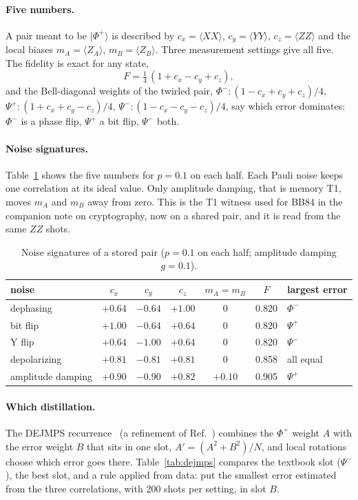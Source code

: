 \documentclass[11pt]{article}
\begin{document}
\paragraph{Five numbers.} A pair meant to be $|\Phi^+\rangle$ is described by
$c_x=\langle XX\rangle$, $c_y=\langle YY\rangle$, $c_z=\langle ZZ\rangle$ and the local biases
$m_A=\langle Z_A\rangle$, $m_B=\langle Z_B\rangle$. Three measurement settings give all five. The
fidelity is exact for any state,
\begin{equation}\label{eq:fid}
F=\tfrac14\,(1+c_x-c_y+c_z),
\end{equation}
and the Bell-diagonal weights of the twirled pair,
$\Phi^-\!:(1-c_x+c_y+c_z)/4$, $\Psi^+\!:(1+c_x+c_y-c_z)/4$, $\Psi^-\!:(1-c_x-c_y-c_z)/4$, say which
error dominates: $\Phi^-$ is a phase flip, $\Psi^+$ a bit flip, $\Psi^-$ both.

\paragraph{Noise signatures.} Table~\ref{tab:sig} shows the five numbers for $p=0.1$ on each half.
Each Pauli noise keeps one correlation at its ideal value. Only amplitude damping, that is memory T1,
moves $m_A$ and $m_B$ away from zero. This is the T1 witness used for BB84 in the companion note on cryptography,
now on a shared pair, and it is read from the same $ZZ$ shots.

\begin{table}[t]
\centering\small
\caption{Noise signatures of a stored pair ($p=0.1$ on each half; amplitude damping $g=0.1$).}
\label{tab:sig}
\begin{tabular}{lcccccl}
\toprule
noise & $c_x$ & $c_y$ & $c_z$ & $m_A=m_B$ & $F$ & largest error\\
\midrule
dephasing & $+0.64$ & $-0.64$ & $\mathbf{+1.00}$ & 0 & 0.820 & $\Phi^-$\\
bit flip & $\mathbf{+1.00}$ & $-0.64$ & $+0.64$ & 0 & 0.820 & $\Psi^+$\\
Y flip & $+0.64$ & $\mathbf{-1.00}$ & $+0.64$ & 0 & 0.820 & $\Psi^-$\\
depolarizing & $+0.81$ & $-0.81$ & $+0.81$ & 0 & 0.858 & all equal\\
amplitude damping & $+0.90$ & $-0.90$ & $+0.82$ & $\mathbf{+0.10}$ & 0.905 & $\Psi^+$\\
\bottomrule
\end{tabular}
\end{table}

\paragraph{Which distillation.} The DEJMPS recurrence~\cite{deutsch1996} (a refinement of
Ref.~\cite{bennett1996}) combines the $\Phi^+$ weight $A$ with the error weight $B$ that sits in one
slot, $A'=(A^2+B^2)/N$, and local rotations choose which error goes there. Table~\ref{tab:dejmps}
compares the textbook slot ($\Psi^-$), the best slot, and a rule applied from data: put the smallest
error estimated from the three correlations, with 200 shots per setting, in slot $B$.
\end{document}
